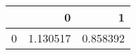 \begin{tabular}{lrr}
\toprule
{} &         0 &         1 \\
\midrule
0 &  1.130517 &  0.858392 \\
\bottomrule
\end{tabular}
